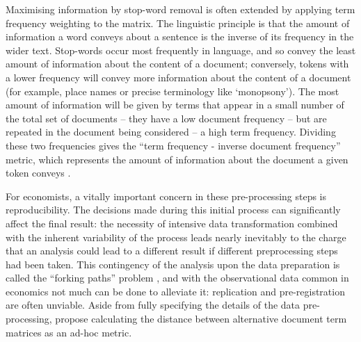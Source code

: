 \documentclass{article}
\begin{document}
Maximising information by stop-word removal is often extended by applying term frequency weighting to the matrix. The linguistic principle is that the amount of information a word conveys about a sentence is the inverse of its frequency in the wider text. Stop-words occur most frequently in language, and so convey the least amount of information about the content of a document; conversely, tokens with a lower frequency will convey more information about the content of a document (for example, place names or precise terminology like `monopsony'). The most amount of information will be given by terms that appear in a small number of the total set of documents -- they have a low document frequency -- but are repeated in the document being considered -- a high term frequency. Dividing these two frequencies gives the ``term frequency - inverse document frequency'' metric, which represents the amount of information about the document a given token conveys \parencite[100]{manningIntroductionInformationRetrieval2008}.

For economists, a vitally important concern in these pre-processing steps is reproducibility. The decisions made during this initial process can significantly affect the final result: the necessity of intensive data transformation combined with the inherent variability of the process leads nearly inevitably to the charge that an analysis could lead to a different result if different preprocessing steps had been taken. This contingency of the analysis upon the data preparation is called the ``forking paths'' problem \parencite{gelmanStatisticalCrisisScience2014}, and with the observational data common in economics not much can be done to alleviate it: replication and pre-registration are often unviable. Aside from fully specifying the details of the data pre-processing, \textcite{dennyTextPreprocessingUnsupervised2018} propose calculating the distance between alternative document term matrices as an ad-hoc metric.
\end{document}
